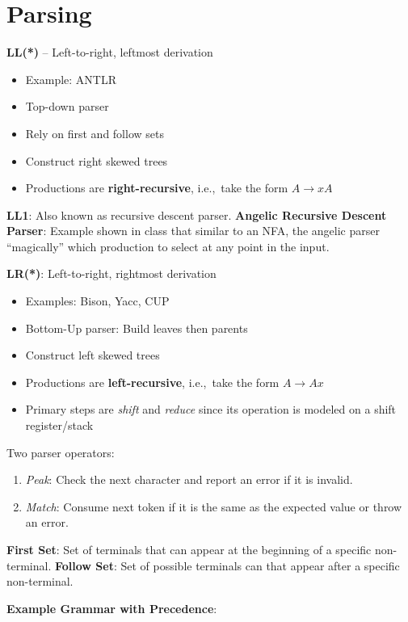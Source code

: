 \documentclass[10pt,twocolumn]{report}
\newcommand{\red}[1]{{\color{red} #1}}
\newcommand{\green}[1]{{\color{green} #1}}
\begin{document}
\section{Parsing}

\textbf{LL(*)} -- Left-to-right, leftmost derivation
\begin{itemize}
  \item Example: ANTLR
  \item Top-down parser
  \item Rely on first and follow sets
  \item Construct right skewed trees
  \item Productions are \textbf{\green{right}-recursive}, i.e.,~take the form ${A\rightarrow xA}$
\end{itemize}
\textbf{LL1}: Also known as recursive descent parser.
\textbf{Angelic Recursive Descent Parser}: Example shown in class that similar to an NFA, the angelic parser ``magically'' which production to select at any point in the input.

\textbf{LR(*)}: Left-to-right, rightmost derivation
\begin{itemize}
  \item Examples: Bison, Yacc, CUP
  \item Bottom-Up parser: Build leaves then parents
  \item Construct left skewed trees
  \item Productions are \textbf{\red{left}-recursive}, i.e.,~take the form ${A\rightarrow Ax}$
  \item Primary steps are \emph{shift} and \emph{reduce} since its operation is modeled on a shift register/stack
\end{itemize}

Two parser operators:
\begin{enumerate}
  \item \textit{Peak}: Check the next character and report an error if it is invalid.
  \item \textit{Match}: Consume next token if it is the same as the expected value or throw an error.
\end{enumerate}

\textbf{First Set}: Set of terminals that can appear at the beginning of a specific non-terminal. \textbf{Follow Set}: Set of possible terminals can that appear after a specific non-terminal.

\textbf{Example Grammar with Precedence}:
\end{document}
